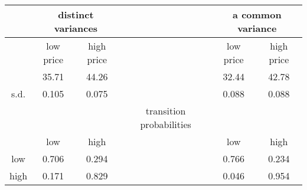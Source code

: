 \begin{tabular}{cccccc}
\toprule
&\multicolumn{2}{c}{distinct   variances}    & &\multicolumn{2}{c}{a common variance}        \\
\midrule
                  & low  price &  high price &                   & low price  & high price  \\
           & 35.71     & 44.26      &              & 32.44     & 42.78    
           \\
           s.d. & 0.105 & 0.075 & & 0.088 & 0.088 \\
\midrule           
 &           &             & transition probabilities &          &            \\ 
 & low & high && low & high \\
   low                & 0.706     & 0.294      &                   & 0.766     & 0.234      \\
   high               & 0.171     & 0.829      &                   & 0.046     & 0.954     \\
                  \bottomrule
\end{tabular}